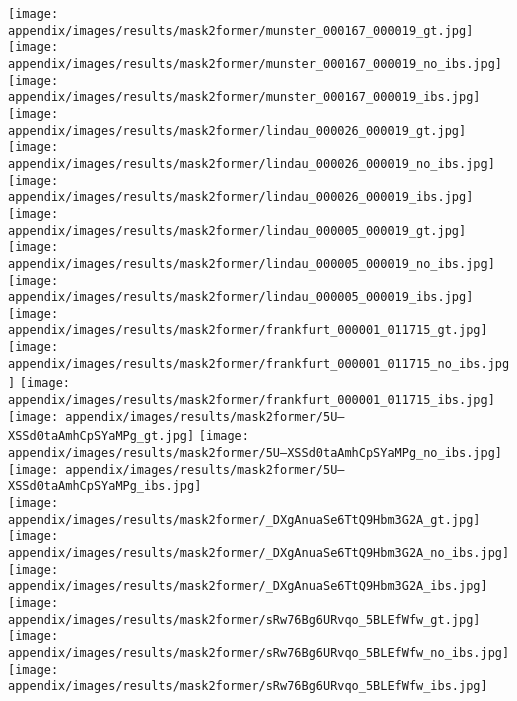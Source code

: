 \documentclass[10pt,twocolumn,letterpaper]{article}
\begin{document}
\begin{figure*}[t]
\centering
\texttt{[image: appendix/images/results/mask2former/munster\_000167\_000019\_gt.jpg]}
\texttt{[image: appendix/images/results/mask2former/munster\_000167\_000019\_no\_ibs.jpg]}
\texttt{[image: appendix/images/results/mask2former/munster\_000167\_000019\_ibs.jpg]}
\\

\texttt{[image: appendix/images/results/mask2former/lindau\_000026\_000019\_gt.jpg]}
\texttt{[image: appendix/images/results/mask2former/lindau\_000026\_000019\_no\_ibs.jpg]}
\texttt{[image: appendix/images/results/mask2former/lindau\_000026\_000019\_ibs.jpg]}
\\

\texttt{[image: appendix/images/results/mask2former/lindau\_000005\_000019\_gt.jpg]}
\texttt{[image: appendix/images/results/mask2former/lindau\_000005\_000019\_no\_ibs.jpg]}
\texttt{[image: appendix/images/results/mask2former/lindau\_000005\_000019\_ibs.jpg]}
\\

\texttt{[image: appendix/images/results/mask2former/frankfurt\_000001\_011715\_gt.jpg]}
\texttt{[image: appendix/images/results/mask2former/frankfurt\_000001\_011715\_no\_ibs.jpg]}
\texttt{[image: appendix/images/results/mask2former/frankfurt\_000001\_011715\_ibs.jpg]}
\\

\texttt{[image: appendix/images/results/mask2former/5U--XSSd0taAmhCpSYaMPg\_gt.jpg]}
\texttt{[image: appendix/images/results/mask2former/5U--XSSd0taAmhCpSYaMPg\_no\_ibs.jpg]}
\texttt{[image: appendix/images/results/mask2former/5U--XSSd0taAmhCpSYaMPg\_ibs.jpg]}
\\

\texttt{[image: appendix/images/results/mask2former/\_DXgAnuaSe6TtQ9Hbm3G2A\_gt.jpg]}
\texttt{[image: appendix/images/results/mask2former/\_DXgAnuaSe6TtQ9Hbm3G2A\_no\_ibs.jpg]}
\texttt{[image: appendix/images/results/mask2former/\_DXgAnuaSe6TtQ9Hbm3G2A\_ibs.jpg]}
\\

\texttt{[image: appendix/images/results/mask2former/sRw76Bg6URvqo\_5BLEfWfw\_gt.jpg]}
\texttt{[image: appendix/images/results/mask2former/sRw76Bg6URvqo\_5BLEfWfw\_no\_ibs.jpg]}
\texttt{[image: appendix/images/results/mask2former/sRw76Bg6URvqo\_5BLEfWfw\_ibs.jpg]}
\\


\end{figure*}
\end{document}
